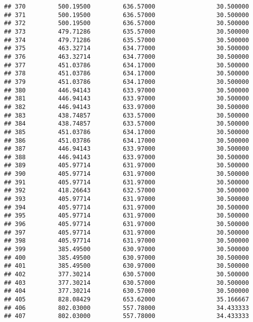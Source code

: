 \documentclass[]{article}
\begin{document}
\begin{verbatim}
## 370         500.19500         636.57000                 30.500000
## 371         500.19500         636.57000                 30.500000
## 372         500.19500         636.57000                 30.500000
## 373         479.71286         635.57000                 30.500000
## 374         479.71286         635.57000                 30.500000
## 375         463.32714         634.77000                 30.500000
## 376         463.32714         634.77000                 30.500000
## 377         451.03786         634.17000                 30.500000
## 378         451.03786         634.17000                 30.500000
## 379         451.03786         634.17000                 30.500000
## 380         446.94143         633.97000                 30.500000
## 381         446.94143         633.97000                 30.500000
## 382         446.94143         633.97000                 30.500000
## 383         438.74857         633.57000                 30.500000
## 384         438.74857         633.57000                 30.500000
## 385         451.03786         634.17000                 30.500000
## 386         451.03786         634.17000                 30.500000
## 387         446.94143         633.97000                 30.500000
## 388         446.94143         633.97000                 30.500000
## 389         405.97714         631.97000                 30.500000
## 390         405.97714         631.97000                 30.500000
## 391         405.97714         631.97000                 30.500000
## 392         418.26643         632.57000                 30.500000
## 393         405.97714         631.97000                 30.500000
## 394         405.97714         631.97000                 30.500000
## 395         405.97714         631.97000                 30.500000
## 396         405.97714         631.97000                 30.500000
## 397         405.97714         631.97000                 30.500000
## 398         405.97714         631.97000                 30.500000
## 399         385.49500         630.97000                 30.500000
## 400         385.49500         630.97000                 30.500000
## 401         385.49500         630.97000                 30.500000
## 402         377.30214         630.57000                 30.500000
## 403         377.30214         630.57000                 30.500000
## 404         377.30214         630.57000                 30.500000
## 405         828.08429         653.62000                 35.166667
## 406         802.03000         557.78000                 34.433333
## 407         802.03000         557.78000                 34.433333

\end{verbatim}
\end{document}
